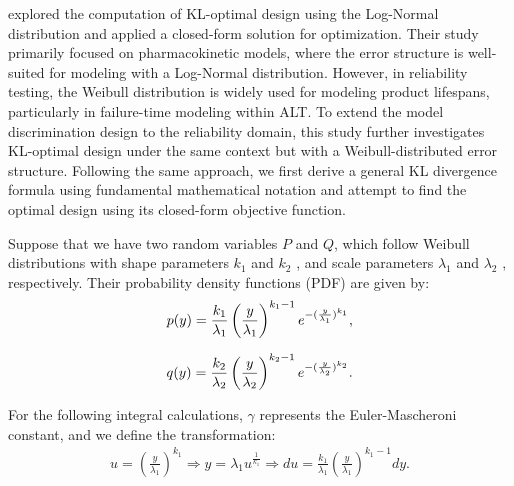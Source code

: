 \hspace*{8mm} \cite{lopez2007optimal} explored the computation of KL-optimal design using the Log-Normal distribution and applied a closed-form solution for optimization. Their study primarily focused on pharmacokinetic models, where the error structure is well-suited for modeling with a Log-Normal distribution. However, in reliability testing, the Weibull distribution is widely used for modeling product lifespans, particularly in failure-time modeling within ALT. To extend the model discrimination design to the reliability domain, this study further investigates KL-optimal design under the same context but with a Weibull-distributed error structure. Following the same approach, we first derive a general KL divergence formula using fundamental mathematical notation and attempt to find the optimal design using its closed-form objective function.  

\hspace*{8mm} Suppose that we have two random variables $P$ and $Q$, which follow Weibull distributions with shape parameters $k_1$ and $k_2$ , and scale parameters $\lambda_1$ and $\lambda_2$ , respectively. Their probability density functions (PDF) are given by:
\begin{equation} \notag
p(y) = \frac{k_1}{\lambda_1} \left(\frac{y}{\lambda_1}\right)^{k_1-1} e^{-(\frac{y}{\lambda_1})^{k_1}}, 
\end{equation}

\begin{equation} \notag
q(y) = \frac{k_2}{\lambda_2} \left(\frac{y}{\lambda_2}\right)^{k_2-1} e^{-(\frac{y}{\lambda_2})^{k_2}}. 
\end{equation}

\hspace*{8mm} For the following integral calculations, $\gamma$ represents the Euler-Mascheroni constant, and we define the transformation:
\begin{align*}
u=\left(\frac{y}{\lambda_1}\right)^{k_1}\Rightarrow y=\lambda_1u^{\frac{1}{k_1}}\Rightarrow du=\frac{k_1}{\lambda_1} \left(\frac{y}{\lambda_1}\right)^{k_1-1}dy.
\end{align*}

